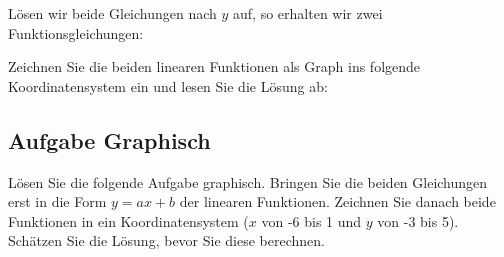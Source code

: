 
Lösen wir beide Gleichungen nach $y$ auf, so erhalten wir zwei Funktionsgleichungen:



Zeichnen Sie die beiden linearen Funktionen als Graph ins folgende
Koordinatensystem ein und lesen Sie die Lösung  ab:

\newpage


\subsection*{Aufgabe Graphisch}
  Lösen Sie die folgende Aufgabe graphisch. Bringen Sie die beiden Gleichungen erst in die Form $y=ax+b$ der linearen Funktionen. Zeichnen Sie danach beide Funktionen in ein Koordinatensystem ($x$ von -6 bis 1 und $y$ von -3 bis 5). Schätzen Sie die Lösung, bevor Sie diese berechnen.



\newpage



\newpage

\TALS{
\newpage}

\TALS{
\newpage}


\newpage

\TALS{
  \newpage}

\TALS{
  \newpage}

\TALS{
\newpage}


\newpage
